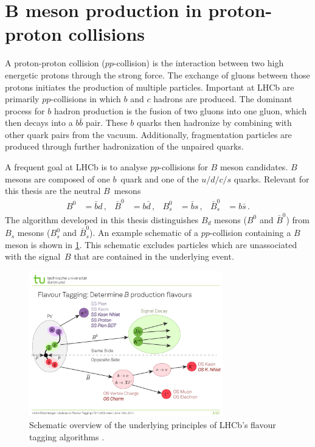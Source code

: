 \section[\texorpdfstring{$B$}{B} meson production in proton-proton collisions]{\texorpdfstring{$\symbf{B}$}{B} meson production in proton-proton collisions}
\label{sec:B_mesons}

A proton-proton collision ($pp$-collision) is the interaction between two high energetic protons through the strong force.
The exchange of gluons between those protons initiates the production of multiple particles. 
Important at LHCb are primarily $pp$-collisions in which $b$ and $c$ hadrons are produced.
The dominant process for $b$ hadron production is the fusion of two gluons into one gluon, which then decays into a $b\bar{b}$ pair.
These $b$ quarks then hadronize by combining with other quark pairs from the vacuum. 
Additionally, fragmentation particles are produced through further hadronization of the unpaired quarks.

A frequent goal at LHCb is to analyse $pp$-collisions for $B$ meson candidates. %
$B$ mesons are composed of one $b$~quark and one of the $u/d/c/s$ quarks.
Relevant for this thesis are the neutral $B$~mesons
\begin{align*}
    B^0 &= \bar{b}d \, , & \bar{B}^0 &= b\bar{d} \, , & B_s^0 &= \bar{b}s \, , & \bar{B}_s^0 &= b\bar{s} \, .
\end{align*}
The algorithm developed in this thesis distinguishes $B_d$ mesons ($B^0$ and $\bar{B}^0$) from $B_s$ mesons ($B_s^0$ and $\bar{B}_s^0$).
An example schematic of a $pp$-collision containing a $B$ meson is shown in \cref{fig:ft_scheme}. 
This schematic excludes particles which are unassociated with the signal~$B$ that are contained in the underlying event.

\begin{figure}
    \centering
    \includegraphics[width=0.75\textwidth]{images/FlavourTaggingScheme.pdf}
    \caption{Schematic overview of the underlying principles of LHCb's flavour tagging algorithms \cite{ft_scheme}.}
    \label{fig:ft_scheme}
\end{figure}

